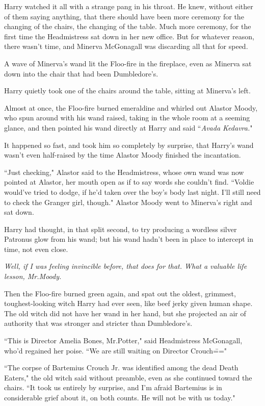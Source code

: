 Harry watched it all with a strange pang in his throat. He knew, without either of them saying anything, that there should have been more ceremony for the changing of the chairs, the changing of the table. Much more ceremony, for the first time the Headmistress sat down in her new office. But for whatever reason, there wasn't time, and Minerva McGonagall was discarding all that for speed.

A wave of Minerva's wand lit the Floo-fire in the fireplace, even as Minerva sat down into the chair that had been Dumbledore's.

Harry quietly took one of the chairs around the table, sitting at Minerva's left.

Almost at once, the Floo-fire burned emeraldine and whirled out Alastor Moody, who spun around with his wand raised, taking in the whole room at a seeming glance, and then pointed his wand directly at Harry and said ``\emph{Avada Kedavra.}"

It happened so fast, and took him so completely by surprise, that Harry's wand wasn't even half-raised by the time Alastor Moody finished the incantation.

``Just checking," Alastor said to the Headmistress, whose own wand was now pointed at Alastor, her mouth open as if to say words she couldn't find. ``Voldie would've tried to dodge, if he'd taken over the boy's body last night. I'll still need to check the Granger girl, though." Alastor Moody went to Minerva's right and sat down.

Harry had thought, in that split second, to try producing a wordless silver Patronus glow from his wand; but his wand hadn't been in place to intercept in time, not even close.

\emph{Well, if I was feeling invincible before, that does for that. What a valuable life lesson, Mr.\?Moody.}

Then the Floo-fire burned green again, and spat out the oldest, grimmest, toughest-looking witch Harry had ever seen, like beef jerky given human shape. The old witch did not have her wand in her hand, but she projected an air of authority that was stronger and stricter than Dumbledore's.

``This is Director Amelia Bones, Mr.\?Potter," said Headmistress McGonagall, who'd regained her poise. ``We are still waiting on Director Crouch\==="

``The corpse of Bartemius Crouch Jr. was identified among the dead Death Eaters," the old witch said without preamble, even as she continued toward the chairs. ``It took us entirely by surprise, and I'm afraid Bartemius is in considerable grief about it, on both counts. He will not be with us today."

